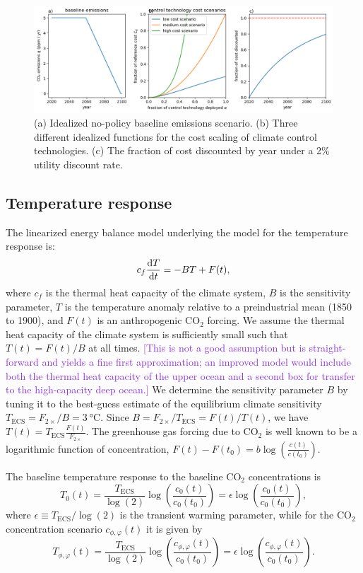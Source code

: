 \documentclass{article}
\begin{document}
\begin{figure}[htb!]
\noindent\includegraphics[width=1.0\textwidth]{figures/model_configuration.png}
\centering
\caption{(a) Idealized no-policy baseline emissions scenario. (b) Three different idealized functions for the cost scaling of climate control technologies. (c) The fraction of cost discounted by year under a 2\% utility discount rate.}
\label{fig-configuration}
\end{figure}

\subsection{Temperature response}
The linearized energy balance model underlying the model for the temperature response is:
\begin{equation}
    c_{f} \dv{T}{t} = -BT + F(t),
\end{equation}
where $c_{f}$ is the thermal heat capacity of the climate system, $B$ is the sensitivity parameter, $T$ is the temperature anomaly relative to a preindustrial mean (1850 to 1900), and $F(t)$ is an anthropogenic CO$_{2}$ forcing. We assume the thermal heat capacity of the climate system is sufficiently small such that $T(t)=F(t)/B$ at all times. \textcolor{BlueViolet}{[This is not a good assumption but is straight-forward and yields a fine first approximation; an improved model would include both the thermal heat capacity of the upper ocean and a second box for transfer to the high-capacity deep ocean.]} We determine the sensitivity parameter $B$ by tuning it to the best-guess estimate of the equilibrium climate sensitivity $T_{\text{ECS}} = F_{2\times}/B = \SI{3}{\celsius}$. Since $B = F_{2\times}/T_{\text{ECS}} = F(t)/T(t)$, we have $T(t) = T_{\text{ECS}} \frac{F(t)}{F_{2\times}}$. The greenhouse gas forcing due to CO$_{2}$ is well known to be a logarithmic function of concentration, $F(t)-F(t_{0}) = b \log(\frac{c(t)}{c(t_{0})})$.

The baseline temperature response to the baseline CO$_{2}$ concentrations is 
\begin{equation}
    T_{0}(t) = \frac{T_{\text{ECS}}}{\log(2)} \log(\frac{c_{0}(t)}{c_{0}(t_{0})}) = \epsilon \log(\frac{c_{0}(t)}{c_{0}(t_{0})}),
\end{equation}
where $\epsilon \equiv T_{\text{ECS}} / \log(2)$ is the transient warming parameter, while for the CO$_{2}$ concentration scenario $c_{\phi,\varphi}(t)$ it is given by
\begin{equation}
    T_{\phi,\varphi}(t) = \frac{T_{\text{ECS}}}{\log(2)} \log(\frac{c_{\phi,\varphi}(t)}{c_{0}(t_{0})}) = \epsilon \log(\frac{c_{\phi,\varphi}(t)}{c_{0}(t_{0})}).
\end{equation}
\end{document}
